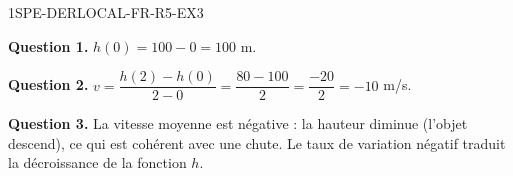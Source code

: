 
\begin{corrige}{1SPE-DERLOCAL-FR-R5-EX3}

\textbf{Question 1.}
$h(0) = 100 - 0 = 100$ m.

\textbf{Question 2.}
$v = \dfrac{h(2)-h(0)}{2-0} = \dfrac{80 - 100}{2} = \dfrac{-20}{2} = -10$ m/s.

\textbf{Question 3.} La vitesse moyenne est négative : la hauteur diminue (l'objet descend), ce qui est cohérent avec une chute. Le taux de variation négatif traduit la décroissance de la fonction $h$.

\end{corrige}
